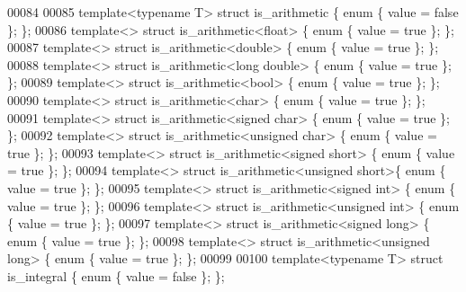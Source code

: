 \begin{DoxyCode}
00084 
00085 \textcolor{keyword}{template}<\textcolor{keyword}{typename} T> \textcolor{keyword}{struct }is\_arithmetic      \{ \textcolor{keyword}{enum} \{ value = \textcolor{keyword}{false} \}; \};
00086 \textcolor{keyword}{template}<> \textcolor{keyword}{struct }is\_arithmetic<float>         \{ \textcolor{keyword}{enum} \{ value = \textcolor{keyword}{true} \}; \};
00087 \textcolor{keyword}{template}<> \textcolor{keyword}{struct }is\_arithmetic<double>        \{ \textcolor{keyword}{enum} \{ value = \textcolor{keyword}{true} \}; \};
00088 \textcolor{keyword}{template}<> \textcolor{keyword}{struct }is\_arithmetic<long double>   \{ \textcolor{keyword}{enum} \{ value = \textcolor{keyword}{true} \}; \};
00089 \textcolor{keyword}{template}<> \textcolor{keyword}{struct }is\_arithmetic<bool>          \{ \textcolor{keyword}{enum} \{ value = \textcolor{keyword}{true} \}; \};
00090 \textcolor{keyword}{template}<> \textcolor{keyword}{struct }is\_arithmetic<char>          \{ \textcolor{keyword}{enum} \{ value = \textcolor{keyword}{true} \}; \};
00091 \textcolor{keyword}{template}<> \textcolor{keyword}{struct }is\_arithmetic<signed char>   \{ \textcolor{keyword}{enum} \{ value = \textcolor{keyword}{true} \}; \};
00092 \textcolor{keyword}{template}<> \textcolor{keyword}{struct }is\_arithmetic<unsigned char> \{ \textcolor{keyword}{enum} \{ value = \textcolor{keyword}{true} \}; \};
00093 \textcolor{keyword}{template}<> \textcolor{keyword}{struct }is\_arithmetic<signed short>  \{ \textcolor{keyword}{enum} \{ value = \textcolor{keyword}{true} \}; \};
00094 \textcolor{keyword}{template}<> \textcolor{keyword}{struct }is\_arithmetic<unsigned short>\{ \textcolor{keyword}{enum} \{ value = \textcolor{keyword}{true} \}; \};
00095 \textcolor{keyword}{template}<> \textcolor{keyword}{struct }is\_arithmetic<signed int>    \{ \textcolor{keyword}{enum} \{ value = \textcolor{keyword}{true} \}; \};
00096 \textcolor{keyword}{template}<> \textcolor{keyword}{struct }is\_arithmetic<unsigned int>  \{ \textcolor{keyword}{enum} \{ value = \textcolor{keyword}{true} \}; \};
00097 \textcolor{keyword}{template}<> \textcolor{keyword}{struct }is\_arithmetic<signed long>   \{ \textcolor{keyword}{enum} \{ value = \textcolor{keyword}{true} \}; \};
00098 \textcolor{keyword}{template}<> \textcolor{keyword}{struct }is\_arithmetic<unsigned long> \{ \textcolor{keyword}{enum} \{ value = \textcolor{keyword}{true} \}; \};
00099 
00100 \textcolor{keyword}{template}<\textcolor{keyword}{typename} T> \textcolor{keyword}{struct }is\_integral        \{ \textcolor{keyword}{enum} \{ value = \textcolor{keyword}{false} \}; \};

\end{DoxyCode}
